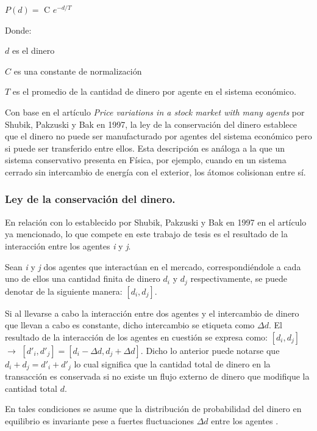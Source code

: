 \begin{center}
$\mathit{P(d)} = $ C $e^{-d/\mathit{T}}$ 
\end{center}
Donde:

$d$ es el dinero

$C$ es una constante de normalización

$\mathit{T}$ es el promedio de la cantidad de dinero por agente en el sistema económico.

Con base en el artículo \textit{Price variations in a stock market with many agents} por Shubik, Pakzuski y Bak en 1997, la ley de la conservación del dinero establece que el dinero no puede ser manufacturado por agentes del sistema económico pero si puede ser transferido entre ellos. Esta descripción es análoga a la que un sistema conservativo presenta en Física, por ejemplo, cuando en un sistema cerrado sin intercambio de energía con el exterior, los átomos colisionan entre sí. 
\newpage

\subsubsection{Ley de la conservación del dinero.} 

En relación con lo establecido por Shubik, Pakzuski y Bak en 1997 en el artículo ya mencionado, lo que compete en este trabajo de tesis es el resultado de la interacción entre los agentes \textit{i} y \textit{j}. 

Sean \textit{i} y \textit{j} dos agentes que interactúan en el mercado, correspondiéndole a cada uno de ellos una cantidad finita de dinero $d_{i}$ y $d_{j}$ respectivamente, se puede denotar de la siguiente manera: $[d_{i},d_{j}]$. 

Si al llevarse a cabo la interacción entre dos agentes y el intercambio de dinero que llevan a cabo es constante, dicho intercambio se etiqueta como $\Delta d$. El resultado de la interacción de los agentes en cuestión se expresa como:  $[d_{i},d_{j}]$ $\longrightarrow$  $[d'_{i},d'_{j}] = [d_{i} - \Delta d ,d_{j} + \Delta d]$. Dicho lo anterior puede notarse que $d_{i} + d_{j} = d'_{i} + d'_{j}$ lo cual significa que la cantidad total de dinero en la transacción es conservada si no existe un flujo externo de dinero que modifique la cantidad total $d$.

En tales condiciones se asume que la distribución de probabilidad del dinero en equilibrio es invariante pese a fuertes fluctuaciones $\Delta d$ entre los agentes \citep[][pagina 149]{cottrell_classical_2009}.


